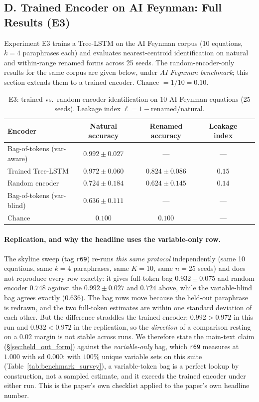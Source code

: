 \subsection*{D. Trained Encoder on AI Feynman: Full Results (E3)}

Experiment E3 trains a Tree-LSTM on the AI Feynman corpus (10 equations, $k{=}4$ paraphrases each) and evaluates nearest-centroid identification on natural and within-range renamed forms across 25 seeds. The random-encoder-only results for the same corpus are given below, under \emph{AI Feynman benchmark}; this section extends them to a trained encoder. Chance $= 1/10 = 0.10$.

\begin{table}[h]
\centering
\caption{E3: trained vs.\ random encoder identification on 10 AI Feynman equations (25 seeds). Leakage index $\ell = 1 - \text{renamed}/\text{natural}$.}
\label{tab:feynman_trained}
\begin{tabular}{lcccc}
\toprule
Encoder & Natural accuracy & Renamed accuracy & Leakage index \\
\midrule
Bag-of-tokens (var-aware) & $0.992 \pm 0.027$ & --- & --- \\
Trained Tree-LSTM & $0.972 \pm 0.060$ & $0.824 \pm 0.086$ & $0.15$ \\
Random encoder    & $0.724 \pm 0.184$ & $0.624 \pm 0.145$ & $0.14$ \\
Bag-of-tokens (var-blind) & $0.636 \pm 0.111$ & --- & --- \\
Chance            & $0.100$           & $0.100$           & --- \\
\bottomrule
\end{tabular}
\end{table}

\paragraph{Replication, and why the headline uses the variable-only row.} The skyline sweep (tag \texttt{r69}) re-runs \emph{this same protocol} independently (same 10 equations, same $k{=}4$ paraphrases, same $K{=}10$, same $n{=}25$ seeds) and does not reproduce every row exactly: it gives full-token bag $0.932 \pm 0.075$ and random encoder $0.748$ against the $0.992 \pm 0.027$ and $0.724$ above, while the variable-blind bag agrees exactly ($0.636$). The bag rows move because the held-out paraphrase is redrawn, and the two full-token estimates are within one standard deviation of each other. But the difference straddles the trained encoder: $0.992 > 0.972$ in this run and $0.932 < 0.972$ in the replication, so the \emph{direction} of a comparison resting on a $0.02$ margin is not stable across runs. We therefore state the main-text claim (\S\ref{sec:held_out_form}) against the \emph{variable-only} bag, which \texttt{r69} measures at $1.000$ with sd $0.000$: with $100\%$ unique variable sets on this suite (Table~\ref{tab:benchmark_survey}), a variable-token bag is a perfect lookup by construction, not a sampled estimate, and it exceeds the trained encoder under either run. This is the paper's own checklist applied to the paper's own headline number.

